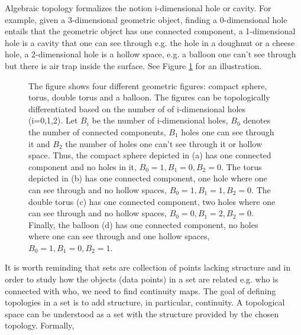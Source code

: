 \documentclass[onecollarge,runningheads]{svjour2}
\begin{document}
Algebraic topology formalizes the notion i-dimensional hole or cavity. For example, given a 3-dimensional geometric object, finding a 0-dimensional hole entails that the geometric object has one connected component, a 1-dimensional hole is a cavity that one can see through e.g. the hole in a doughnut or a cheese hole, a 2-dimensional hole is a hollow space, e.g. a balloon one can't see through but there is air trap inside the surface. See Figure \ref{fig:iholes} for an illustration.

\begin{figure}
\centering
{} 
\caption{The figure shows four different geometric figures: compact sphere, torus, double torus and a balloon. The figures can be topologically differentiated based on the number of of i-dimensional holes (i=0,1,2). Let $B_i$ be  the number of i-dimensional holes, $B_0$ denotes the number of connected components, $B_1$ holes one can see through it and $B_2$ the number of holes one can't see through it or hollow space. Thus, the compact sphere depicted in (a) has one connected component and no holes in it, $B_0=1, B_1=0, B_2=0$. The torus depicted in (b) has one connected component, one hole where one can see through and no hollow spaces, $B_0=1, B_1=1, B_2=0$. The double torus (c) has one connected component, two holes where one can see through and no hollow spaces, $B_0=0, B_1=2, B_2=0$. Finally, the balloon (d) has one connected component, no holes where one can see through and one hollow spaces, $B_0=1, B_1=0, B_2=1$.}
\label{fig:iholes}
\end{figure}

It is worth reminding that sets are collection of points lacking structure and in order to study how the objects (data points) in a set are related e.g. who is connected with who, we need to find continuity maps. The goal of defining topologies in a set is to add structure, in particular, continuity.
A topological space can be understood as a set with the structure provided by the chosen topology. Formally,  
\end{document}
